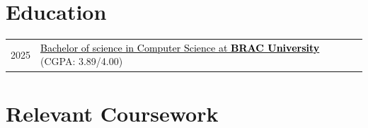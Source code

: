 \documentclass[a4paper,12pt]{article}
\makeatletter
\newenvironment{joblong}[2]
    {
    \begin{tabularx}{\linewidth}{@{}l X r@{}}
    \textbf{#1} & \hfill &  #2 \\[3.75pt]
    \end{tabularx}
    \begin{minipage}[t]{\linewidth}
    \begin{itemize}[nosep,after=\strut, leftmargin=1em, itemsep=3pt,label=--]
    }
    {
    \end{itemize}
    \end{minipage}    
    }
\makeatother
\begin{document}

\section{Education}
\begin{tabularx}{\linewidth}{@{}l X@{}}
    2025 & \href{https://drive.google.com/file/d/1VTK5ltNdR83h-0LRuFuUIcngbCqoCtQM/view?usp=sharing}{\textcolor{black}{Bachelor of science in Computer Science at \textbf{BRAC University}}} \hfill (CGPA: 3.89/4.00) \\
\end{tabularx}

\section{Relevant Coursework}

\end{document}

